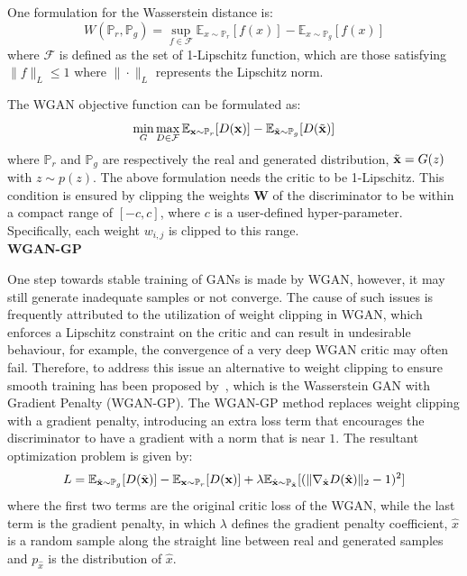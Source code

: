 \noindent One formulation for the Wasserstein distance is:
\begin{equation}
    \label{eq:waaserstein distance}
    W(\mathbb{P}_r , \mathbb{P}_g)= \sup_{f \in \mathcal{F}} \mathbb{E}_{x\sim \mathbb{P}_r}[f(x)] - \mathbb{E}_{x \sim \mathbb{P}_g}[f(x)]
\end{equation}
where $\mathcal{F}$ is defined as the set of 1-Lipschitz function, which are those satisfying $\|f\|_L \leq 1$ where $\| \cdot \|_L$ represents the Lipschitz norm.

\noindent The WGAN objective function can be formulated as:
\begin{equation}
    \min_G \max_{D \in \mathcal{F}} \mathbb{E}_{\mathbf{x} \sim \mathbb{P}_r} [D(\mathbf{x})] - \mathbb{E}_{\Tilde{\mathbf{x}} \sim \mathbb{P}_g}[D(\Tilde{\mathbf{x}})]
\end{equation}
where $\mathbb{P}_r$ and $\mathbb{P}_g$ are respectively the real and generated distribution, $\Tilde{\mathbf{x}} = G(z)$ with $z \sim p(z)$.
The above formulation needs the critic to be 1-Lipschitz. This condition is ensured by clipping the weights $\mathbf{W}$ of the discriminator to be within a compact range of $[-c ,c]$, where $c$ is a user-defined hyper-parameter. Specifically, each weight $w_{i,j}$ is clipped to this range.\\
%

\noindent \textbf{WGAN-GP}

\noindent One step towards stable training of GANs is made by WGAN, however, it may still generate inadequate samples or not converge. The cause of such issues is frequently attributed to the utilization of weight clipping in WGAN, which enforces a Lipschitz constraint on the critic and can result in undesirable behaviour, for example, the convergence of a very deep WGAN critic may often fail. Therefore, to address this issue an alternative to weight clipping to ensure smooth training has been proposed by~\cite{wgan-gp}, which is the Wasserstein GAN with Gradient Penalty (WGAN-GP).
The WGAN-GP method replaces weight clipping with a gradient penalty, introducing an extra loss term that encourages the discriminator to have a gradient with a norm that is near $1$. The resultant optimization problem is given by: 
\begin{equation}
    L = \mathbb{E}_{\Tilde{\mathbf{x}}\sim \mathbb{P}_g}[D(\Tilde{\mathbf{x}})] - \mathbb{E}_{\mathbf{x}\sim \mathbb{P}_r}[D(\mathbf{x})] + \lambda \mathbb{E}_{\hat{\mathbf{x}}\sim \mathbb{P}_{\hat{\mathbf{x}}}} [( \| \nabla_{\hat{\mathbf{x}}} D( \hat{\mathbf{x}}) \|_2 - 1)^2]
\end{equation}
where the first two terms are the original critic loss of the WGAN, while the last term is the gradient penalty, in which $\lambda$ defines the gradient penalty coefficient, $\hat{x}$ is a random sample along the straight line between real and generated samples and $p_{\hat{x}}$ is the distribution of $\hat{x}$.
